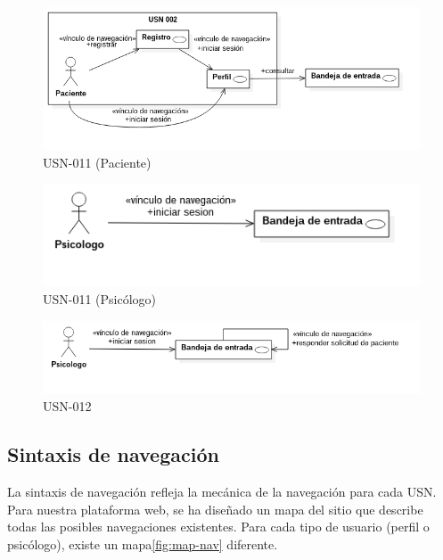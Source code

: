 \begin{figure}[htbp] 
    \centering
    \includegraphics[width=1\textwidth]{figuras/usn/usn011_pac.png}
    \caption{USN-011 (Paciente)}
    \label{fig:usn-011-pac}
\end{figure}	

\begin{figure}[htbp] 
    \centering
    \includegraphics[width=1\textwidth]{figuras/usn/usn011_psic.png}
    \caption{USN-011 (Psicólogo)}
    \label{fig:usn-011-psic}
\end{figure}	

\begin{figure}[htbp] 
    \centering
    \includegraphics[width=1\textwidth]{figuras/usn/usn012.png}
    \caption{USN-012}
    \label{fig:usn-012}
\end{figure}	

\subsection{Sintaxis de navegación}
La sintaxis de navegación refleja la mecánica de la navegación para cada USN. Para nuestra plataforma web, se ha diseñado un mapa del sitio que describe todas las posibles navegaciones existentes. Para cada tipo de usuario (perfil o psicólogo), existe un mapa\ref{fig:map-nav} diferente.

